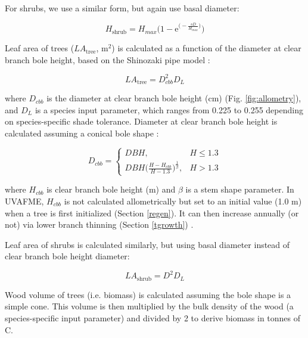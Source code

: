 \documentclass[a4paper, 12pt] {report}
\begin{document}
For shrubs, we use a similar form, but again use basal diameter:

\begin{equation}\label{eq:ht_shrub}
	H_{\text{shrub}} = H_{max}\Bigg(1 - \text{e}^{\Big(-\frac{sD}{H_{max}}\Big)}\Bigg)
\end{equation}

Leaf area of trees ($LA_\text{tree}$, m$^2$) is calculated as a function of the diameter at clear branch bole height, based on the Shinozaki pipe model :

\begin{equation} \label{leafarea}
LA_\text{tree} = D_{cbb}^2D_L
\end{equation}

where $D_{cbb}$ is the diameter at clear branch bole height (cm) (Fig. \ref{fig:allometry}), and $D_L$ is a species input parameter, which ranges from 0.225 to 0.255 depending on species-specific shade tolerance. Diameter at clear branch bole height is calculated assuming a conical bole shape \cite{yanFAREASTForestGap2005}:

\begin{equation} \label{dcbb}
D_{cbb} = \begin{cases}
DBH, & \text{$H \le 1.3$}\\
DBH\Big(\frac{H - H_{cbb}}{H - 1.3}\Big)^{\frac{1}{\beta}}, & \text{$H > 1.3$}
\end{cases}
\end{equation}

where $H_{cbb}$ is clear branch bole height (m) and $\beta$ is a stem shape parameter. In UVAFME, $H_{cbb}$ is not calculated allometrically but set to an initial value (1.0 m) when a tree is first initialized (Section \ref{regen}). It can then increase annually (or not) via lower branch thinning (Section \ref{tgrowth}) \cite{yanFAREASTForestGap2005}. 

Leaf area of shrubs is calculated similarly, but using basal diameter instead of clear branch bole height diameter:

\begin{equation} \label{leafarea_shrub}
	LA_\text{shrub} = D^2D_L
\end{equation}

Wood volume of trees (i.e. biomass) is calculated assuming the bole shape is a simple cone. This volume is then multiplied by the bulk density of the wood (a species-specific input parameter) and divided by 2 to derive biomass in tonnes of C.
\end{document}
